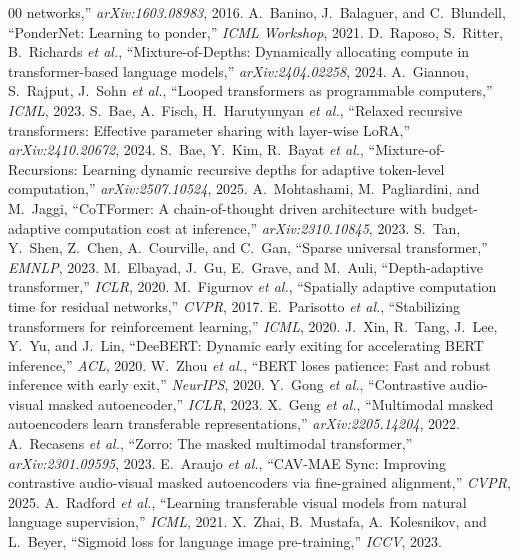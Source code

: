 \documentclass[conference]{IEEEtran}
\begin{document}
\begin{thebibliography}{00}
networks,'' \emph{arXiv:1603.08983}, 2016.
 A.~Banino, J.~Balaguer, and C.~Blundell, ``PonderNet:
Learning to ponder,'' \emph{ICML Workshop}, 2021.
 D.~Raposo, S.~Ritter, B.~Richards \emph{et al.}, ``Mixture-of-Depths:
Dynamically allocating compute in transformer-based language models,''
\emph{arXiv:2404.02258}, 2024.
 A.~Giannou, S.~Rajput, J.~Sohn \emph{et al.}, ``Looped
transformers as programmable computers,'' \emph{ICML}, 2023.
 S.~Bae, A.~Fisch, H.~Harutyunyan \emph{et al.}, ``Relaxed
recursive transformers: Effective parameter sharing with layer-wise LoRA,''
\emph{arXiv:2410.20672}, 2024.
 S.~Bae, Y.~Kim, R.~Bayat \emph{et al.}, ``Mixture-of-Recursions:
Learning dynamic recursive depths for adaptive token-level computation,''
\emph{arXiv:2507.10524}, 2025.
 A.~Mohtashami, M.~Pagliardini, and M.~Jaggi, ``CoTFormer: A
chain-of-thought driven architecture with budget-adaptive computation cost at
inference,'' \emph{arXiv:2310.10845}, 2023.
 S.~Tan, Y.~Shen, Z.~Chen, A.~Courville, and C.~Gan, ``Sparse universal
transformer,'' \emph{EMNLP}, 2023.
 M.~Elbayad, J.~Gu, E.~Grave, and M.~Auli, ``Depth-adaptive
transformer,'' \emph{ICLR}, 2020.
 M.~Figurnov \emph{et al.}, ``Spatially adaptive computation time for
residual networks,'' \emph{CVPR}, 2017.
 E.~Parisotto \emph{et al.}, ``Stabilizing transformers for
reinforcement learning,'' \emph{ICML}, 2020.
 J.~Xin, R.~Tang, J.~Lee, Y.~Yu, and J.~Lin, ``DeeBERT: Dynamic
early exiting for accelerating BERT inference,'' \emph{ACL}, 2020.
 W.~Zhou \emph{et al.}, ``BERT loses patience: Fast and robust
inference with early exit,'' \emph{NeurIPS}, 2020.
 Y.~Gong \emph{et al.}, ``Contrastive audio-visual masked
autoencoder,'' \emph{ICLR}, 2023.
 X.~Geng \emph{et al.}, ``Multimodal masked autoencoders learn
transferable representations,'' \emph{arXiv:2205.14204}, 2022.
 A.~Recasens \emph{et al.}, ``Zorro: The masked multimodal
transformer,'' \emph{arXiv:2301.09595}, 2023.
 E.~Araujo \emph{et al.}, ``CAV-MAE Sync: Improving contrastive
audio-visual masked autoencoders via fine-grained alignment,'' \emph{CVPR}, 2025.
 A.~Radford \emph{et al.}, ``Learning transferable visual models
from natural language supervision,'' \emph{ICML}, 2021.
 X.~Zhai, B.~Mustafa, A.~Kolesnikov, and L.~Beyer, ``Sigmoid loss
for language image pre-training,'' \emph{ICCV}, 2023.

\end{thebibliography}
\end{document}
